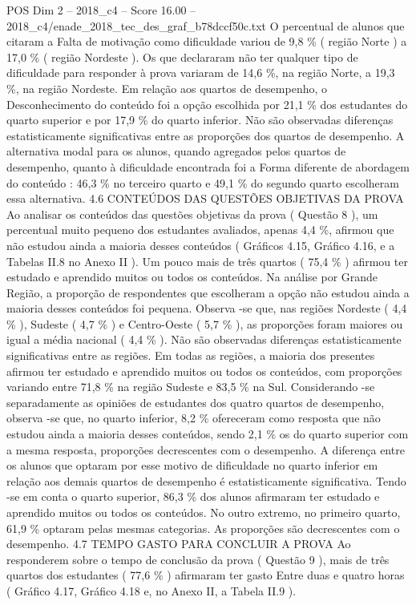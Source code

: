 \begin{textsample}{POS Dim 2 – 2018\_c4 – Score 16.00 – 2018\_c4/enade\_2018\_tec\_des\_graf\_b78dccf50c.txt}
O percentual de alunos que citaram a Falta de motivação como dificuldade variou de 9,8 \% ( região Norte ) a 17,0 \% ( região Nordeste ).
Os que declararam não ter qualquer tipo de dificuldade para responder à prova variaram de 14,6 \%, na região Norte, a 19,3 \%, na região Nordeste.
Em relação aos quartos de desempenho, o Desconhecimento do conteúdo foi a opção escolhida por 21,1 \% dos estudantes do quarto superior e por 17,9 \% do quarto inferior.
Não são observadas diferenças estatisticamente significativas entre as proporções dos quartos de desempenho.
A alternativa modal para os alunos, quando agregados pelos quartos de desempenho, quanto à dificuldade encontrada foi a Forma diferente de abordagem do conteúdo : 46,3 \% no terceiro quarto e 49,1 \% do segundo quarto escolheram essa alternativa. 4.6 CONTEÚDOS DAS QUESTÕES OBJETIVAS DA PROVA Ao analisar os conteúdos das questões objetivas da prova ( Questão 8 ), um percentual muito pequeno dos estudantes avaliados, apenas 4,4 \%, afirmou que não estudou ainda a maioria desses conteúdos ( Gráficos 4.15, Gráfico 4.16, e a Tabelas II.8 no Anexo II ).
Um pouco mais de três quartos ( 75,4 \% ) afirmou ter estudado e aprendido muitos ou todos os conteúdos.
Na análise por Grande Região, a proporção de respondentes que escolheram a opção não estudou ainda a maioria desses conteúdos foi pequena.
Observa -se que, nas regiões Nordeste ( 4,4 \% ), Sudeste ( 4,7 \% ) e Centro-Oeste ( 5,7 \% ), as proporções foram maiores ou igual a média nacional ( 4,4 \% ).
Não são observadas diferenças estatisticamente significativas entre as regiões.
Em todas as regiões, a maioria dos presentes afirmou ter estudado e aprendido muitos ou todos os conteúdos, com proporções variando entre 71,8 \% na região Sudeste e 83,5 \% na Sul.
Considerando -se separadamente as opiniões de estudantes dos quatro quartos de desempenho, observa -se que, no quarto inferior, 8,2 \% ofereceram como resposta que não estudou ainda a maioria desses conteúdos, sendo 2,1 \% os do quarto superior com a mesma resposta, proporções decrescentes com o desempenho.
A diferença entre os alunos que optaram por esse motivo de dificuldade no quarto inferior em relação aos demais quartos de desempenho é estatisticamente significativa.
Tendo -se em conta o quarto superior, 86,3 \% dos alunos afirmaram ter estudado e aprendido muitos ou todos os conteúdos.
No outro extremo, no primeiro quarto, 61,9 \% optaram pelas mesmas categorias.
As proporções são decrescentes com o desempenho. 4.7 TEMPO GASTO PARA CONCLUIR A PROVA Ao responderem sobre o tempo de conclusão da prova ( Questão 9 ), mais de três quartos dos estudantes ( 77,6 \% ) afirmaram ter gasto Entre duas e quatro horas ( Gráfico 4.17, Gráfico 4.18 e, no Anexo II, a Tabela II.9 ).

\end{textsample}
